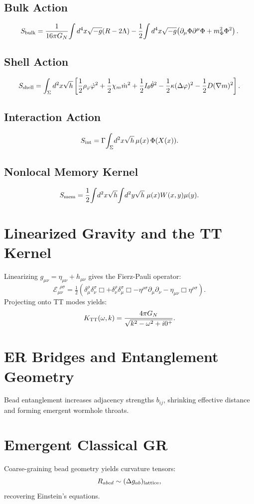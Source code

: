 \documentclass[12pt]{article}
\begin{document}
\subsection{Bulk Action}
\[
S_{\rm bulk}
= \frac{1}{16\pi G_N}\!\int d^4x\sqrt{-g}(R - 2\Lambda)
- \frac{1}{2}\!\int d^4x\sqrt{-g}\!
\left(\partial_\mu\Phi \partial^\mu\Phi + m_\Phi^2\Phi^2\right).
\]

\subsection{Shell Action}
\[
S_{\rm shell} = \int_{\Sigma} d^2x\sqrt{h}
\left[
\frac{1}{2}\rho_\varphi \dot{\varphi}^2
+ \frac{1}{2}\chi_m \dot{m}^2
+ \frac{1}{2}I_\theta \dot{\theta}^2
- \frac{1}{2}\kappa (\Delta\varphi)^2
- \frac{1}{2}D (\nabla m)^2
\right].
\]

\subsection{Interaction Action}
\[
S_{\rm int}
= \Gamma\!\int_{\Sigma}\! d^2x\sqrt{h}\,\mu(x)\,\Phi(X(x)).
\]

\subsection{Nonlocal Memory Kernel}
\[
S_{\rm mem}
= \frac{1}{2}\!\int\! d^2x\sqrt{h}\!\int\! d^2y\sqrt{h}\;\mu(x)W(x,y)\mu(y).
\]

\section{Linearized Gravity and the TT Kernel}
Linearizing $g_{\mu\nu}=\eta_{\mu\nu}+h_{\mu\nu}$ gives the Fierz-Pauli operator:
\[
\mathcal E_{\mu\nu}^{\ \ \rho\sigma}
= \tfrac12(\delta_\mu^\rho \delta_\nu^\sigma\Box
+ \delta_\nu^\rho\delta_\mu^\sigma\Box
- \eta^{\rho\sigma}\partial_\mu\partial_\nu
- \eta_{\mu\nu}\Box\eta^{\rho\sigma}).
\]
Projecting onto TT modes yields:
\[
K_{\rm TT}(\omega,k)
= \frac{4\pi G_N}{\sqrt{k^2 - \omega^2 + i0^+}}.
\]

\section{ER Bridges and Entanglement Geometry}
Bead entanglement increases adjacency strengths $b_{ij}$, shrinking effective 
distance and forming emergent wormhole throats.

\section{Emergent Classical GR}
Coarse-graining bead geometry yields curvature tensors:
\[
R_{abcd} \sim (\Delta g_{ab})_{\rm lattice},
\]
recovering Einstein's equations.
\end{document}

